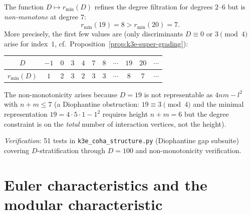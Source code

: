 \begin{proposition}
\label{prop:k3e-non-monotone}
The function $D \mapsto r_{\min}(D)$ refines the degree filtration for degrees $2$--$6$ but is \emph{non-monotone} at degree $7$:
\[
 r_{\min}(19) = 8 > r_{\min}(20) = 7.
\]
More precisely, the first few values are (only discriminants $D \equiv 0$ or $3 \pmod{4}$ arise for index~$1$, cf.\ Proposition~\ref{prop:k3e-super-grading}):
\begin{center}
\begin{tabular}{c|cccccccccc}
$D$ & $-1$ & $0$ & $3$ & $4$ & $7$ & $8$ & $\cdots$ & $19$ & $20$ & $\cdots$ \\ \hline
$r_{\min}(D)$ & $1$ & $2$ & $3$ & $2$ & $3$ & $3$ & $\cdots$ & $8$ & $7$ & $\cdots$
\end{tabular}
\end{center}
The non-monotonicity arises because $D = 19$ is not representable as $4nm - l^2$ with $n + m \leq 7$ (a Diophantine obstruction: $19 \equiv 3 \pmod{4}$ and the minimal representation $19 = 4 \cdot 5 \cdot 1 - 1^2$ requires height $n + m = 6$ but the degree constraint is on the \emph{total} number of interaction vertices, not the height).
\ClaimStatusProvedHere
\end{proposition}

\noindent\textit{Verification}: 51 tests in \texttt{k3e\_coha\_structure.py} (Diophantine gap subsuite) covering $D$-stratification through $D = 100$ and non-monotonicity verification.

\section{Euler characteristics and the modular characteristic}
\label{sec:k3e-euler-kappa}



